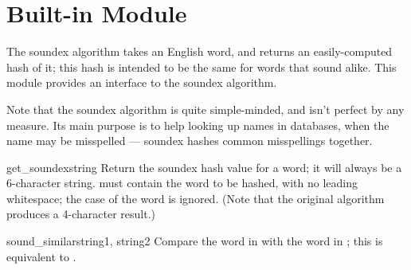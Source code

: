 \section{Built-in Module }
\label{module-soundex}


The soundex algorithm takes an English word, and returns an
easily-computed hash of it; this hash is intended to be the same for
words that sound alike.  This module provides an interface to the
soundex algorithm.

Note that the soundex algorithm is quite simple-minded, and isn't
perfect by any measure.  Its main purpose is to help looking up names
in databases, when the name may be misspelled --- soundex hashes common
misspellings together.

\begin{funcdesc}{get_soundex}{string}
Return the soundex hash value for a word; it will always be a
6-character string.   must contain the word to be hashed,
with no leading whitespace; the case of the word is ignored.  (Note
that the original algorithm produces a 4-character result.)
\end{funcdesc}

\begin{funcdesc}{sound_similar}{string1, string2}
Compare the word in  with the word in ; this
is equivalent to 
 \code{==}
.
\end{funcdesc}


\begin{seealso}


\end{seealso}
